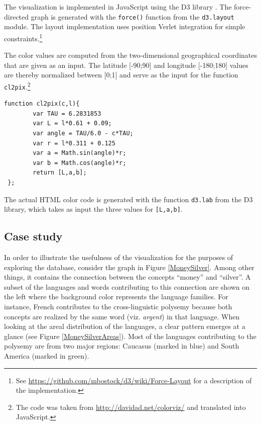The visualization is implemented in JavaScript using the D3 library \cite{D3}. The force-directed graph is  generated with the \texttt{force()} function from the \texttt{d3.layout} module. The layout implementation uses position Verlet integration for simple constraints.\footnote{See \url{https://github.com/mbostock/d3/wiki/Force-Layout} for a description of the implementation.}

The color values are computed from the two-dimensional geographical coordinates that are given as an input. The latitude [-90;90] and longitude [-180;180] values are thereby normalized between [0;1] and serve as the input for the function \texttt{cl2pix}.\footnote{The code was taken from \url{http://davidad.net/colorviz/} and translated into JavaScript.}

\begin{verbatim}
function cl2pix(c,l){
   		var TAU = 6.2831853 
   		var L = l*0.61 + 0.09; 
   		var angle = TAU/6.0 - c*TAU;   
   		var r = l*0.311 + 0.125 
   		var a = Math.sin(angle)*r;
   		var b = Math.cos(angle)*r;
   		return [L,a,b];
 };
\end{verbatim}

The actual HTML color code is generated with the function \texttt{d3.lab} from the D3 library, which takes as input the three values for \texttt{[L,a,b]}.

\subsection{Case study}

In order to illustrate the usefulness of the visualization for the purposes of exploring the database, consider the graph in Figure \ref{MoneySilver}. Among other things, it contains the connection between the concepts ``money'' and ``silver''. A subset of the languages and words contributing to this connection are shown on the left where the background color represents the language families. For instance, French contributes to the cross-linguistic polysemy because both concepts are realized by the same word (viz. \textit{argent}) in that language. When looking at the areal distribution of the languages, a clear pattern emerges at a glance (see Figure \ref{MoneySilverAreas}). Most of the languages contributing to the polysemy are from two major regions: Caucasus (marked in blue) and South America (marked in green).  


